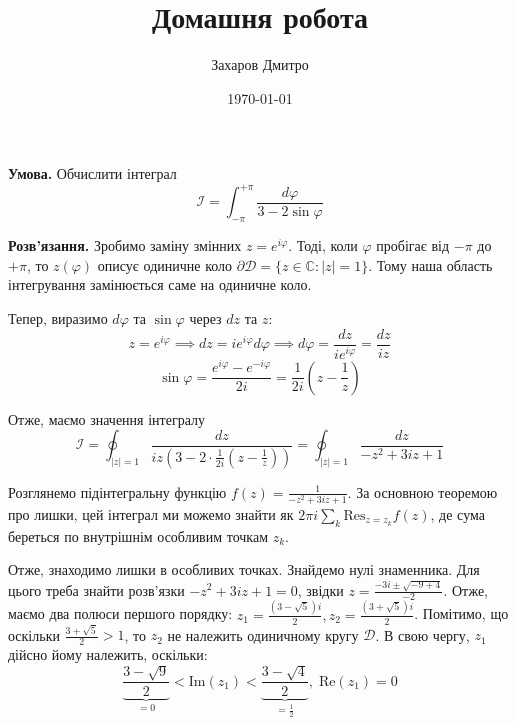 \documentclass[oneside,solution]{karazin-complan-assign}
\title{Домашня робота}
\author{Захаров Дмитро}
\date{\today}
\begin{document}
\maketitle


\problem{}

\textbf{Умова.} Обчислити інтеграл
\begin{equation*}
    \mathcal{I} = \int_{-\pi}^{+\pi} \frac{d\varphi}{3-2\sin\varphi}
\end{equation*}

\textbf{Розв'язання.} Зробимо заміну змінних $z=e^{i\varphi}$. Тоді, коли $\varphi$ пробігає від $-\pi$ до $+\pi$, то $z(\varphi)$ описує одиничне коло $\partial\mathcal{D}=\{z \in \mathbb{C}: |z| = 1\}$. Тому наша область інтегрування замінюється саме на одиничне коло. 

Тепер, виразимо $d\varphi$ та $\sin \varphi$ через $dz$ та $z$:
\begin{equation}
    z = e^{i\varphi} \implies dz = ie^{i\varphi}d\varphi \implies d\varphi = \frac{dz}{ie^{i\varphi}} = \frac{dz}{iz}
\end{equation}
\begin{equation}
    \sin \varphi = \frac{e^{i\varphi} - e^{-i\varphi}}{2i} = \frac{1}{2i}\left(z - \frac{1}{z}\right)
\end{equation}

Отже, маємо значення інтегралу
\begin{equation}
    \mathcal{I} = \oint_{|z|=1} \frac{dz}{iz\left(3 - 2 \cdot \frac{1}{2i}\left(z-\frac{1}{z}\right)\right)} = \oint_{|z|=1} \frac{dz}{-z^2 + 3iz + 1}
\end{equation}

Розглянемо підінтегральну функцію $f(z) = \frac{1}{-z^2+3iz + 1}$. За основною теоремою про лишки, цей інтеграл ми можемо знайти як $2\pi i \sum_k \text{Res}_{z=z_k}f(z)$, де сума береться по внутрішнім особливим точкам $z_k$. 

Отже, знаходимо лишки в особливих точках. Знайдемо нулі знаменника. Для цього треба знайти розв'язки  $-z^2+3iz+1 = 0$, звідки $z = \frac{-3i \pm \sqrt{-9+4}}{-2}$. Отже, маємо два полюси першого порядку: $z_1=\frac{(3-\sqrt{5})i}{2},z_2 = \frac{(3+\sqrt{5})i}{2}$. Помітимо, що оскільки $\frac{3+\sqrt{5}}{2} > 1$, то $z_2$ не належить одиничному кругу $\mathcal{D}$. В свою чергу, $z_1$ дійсно йому належить, оскільки:
\begin{equation}
    \underbrace{\frac{3-\sqrt{9}}{2}}_{=0} < \text{Im}(z_1) < \underbrace{\frac{3-\sqrt{4}}{2}}_{=\frac{1}{2}}, \; \text{Re}(z_1) = 0
\end{equation}
\end{document}
